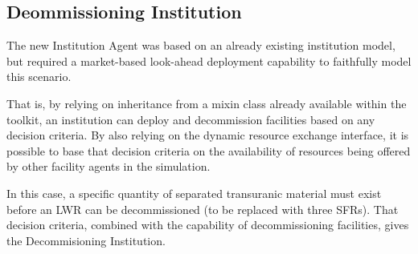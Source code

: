 
\subsection{Deommissioning Institution}

The new Institution Agent was based on an already existing institution
model, but required a market-based look-ahead deployment capability to
faithfully model this scenario. 

That is, by relying on inheritance from a mixin class already available within 
the \Cyclus toolkit, an institution can deploy and decommission facilities 
based on any decision criteria. By also relying on the dynamic resource 
exchange interface, it is possible to base that decision criteria on the 
availability of resources being offered by other facility agents in the 
simulation. 

In this case, a specific quantity of separated transuranic material must exist 
before an LWR can be decommissioned (to be replaced with three SFRs). That 
decision criteria, combined with the capability of decommissioning facilities, 
gives the Decommisioning Institution. 


